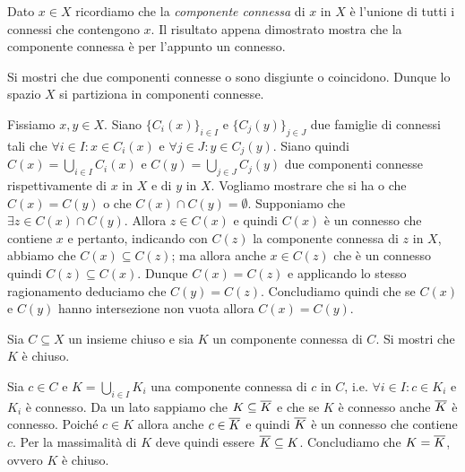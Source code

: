 \documentclass[a4paper]{article}\par \usepackage{style}\par
\begin{document}
Dato $ x \in X $ ricordiamo che la \emph{componente connessa} di $ x $ in $ X $ è l'unione di tutti i connessi che contengono $ x $. Il risultato appena dimostrato mostra che la componente connessa è per l'appunto un connesso.\par \begin{es}
  Si mostri che due componenti connesse o sono disgiunte o coincidono. Dunque lo spazio $ X $ si partiziona in componenti connesse.
\end{es}\par Fissiamo $ x, y \in X $. Siano $ \{C_i(x)\}_{i \in I} $ e $ \{C_j(y)\}_{j \in J} $ due famiglie di connessi tali che $ \forall i \in I : x \in C_i(x) $ e $ \forall j \in J : y \in C_j(y) $. Siano quindi $ C(x) = \bigcup_{i \in I} C_i(x) $ e $ C(y) = \bigcup_{j \in J} C_j(y) $ due componenti connesse rispettivamente di $ x $ in $ X $ e di $ y $ in $ X $. Vogliamo mostrare che si ha o che $ C(x) = C(y) $ o che $ C(x) \cap C(y) = \emptyset $. Supponiamo che $ \exists z \in C(x) \cap C(y) $. Allora $ z \in C(x) $ e quindi $ C(x) $ è un connesso che contiene $ x $ e pertanto, indicando con $ C(z) $ la componente connessa di $ z $ in $ X $, abbiamo che $ C(x) \subseteq C(z) $; ma allora anche $ x \in C(z) $ che è un connesso quindi $ C(z) \subseteq C(x) $. Dunque $ C(x) = C(z) $ e applicando lo stesso ragionamento deduciamo che $ C(y) = C(z) $. Concludiamo quindi che se $ C(x) $ e $ C(y) $ hanno intersezione non vuota allora $ C(x) = C(y) $.\par \begin{es}
  Sia $ C \subseteq X $ un insieme chiuso e sia $ K $ un componente connessa di $ C $. Si mostri che $ K $ è chiuso.
\end{es}\par Sia $ c \in C $ e $ K = \bigcup_{i \in I} K_i $ una componente connessa di $ c $ in $ C $, i.e. $ \forall i \in I : c \in K_i $ e $ K_i $ è connesso. Da un lato sappiamo che $ K \subseteq \overline{K} $ e che se $ K $ è connesso anche $ \overline{K} $ è connesso. Poiché $ c \in K $ allora anche $ c \in \overline{K} $ e quindi $ \overline{K} $ è un connesso che contiene $ c $. Per la massimalità di $ K $ deve quindi essere $ \overline{K} \subseteq K $. Concludiamo che $ K = \overline{K} $, ovvero $ K $ è chiuso. \\
\end{document}
